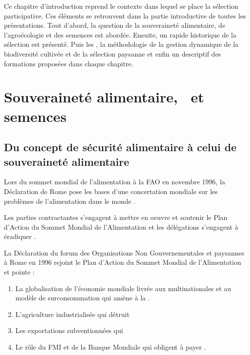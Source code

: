 Ce chapitre d'introduction reprend le contexte dans lequel se place la sélection participative.
Ces éléments se retrouvent dans la partie introductive de toutes les présentations.
Tout d'abord, la question de la souveraineté alimentaire, de l'agroécologie et des semences est abordée.
Ensuite, un rapide historique de la sélection est présenté.
Puis les \MSPs, 
la méthodologie de la gestion dynamique de la biodiversité cultivée et de la sélection paysanne et enfin
un descriptif des formations proposées dans chaque chapitre.

\newpage


\section{Souveraineté alimentaire, \agec~et semences}
\subsection{Du concept de sécurité alimentaire à celui de souveraineté alimentaire}

Lors du sommet mondial de l'alimentation à la FAO en novembre 1996, la Déclaration de Rome pose les bases d'une concertation mondiale sur les problèmes de l'alimentation dans le monde \cite{fao_declaration_1996}.

Les parties contractantes s'engagent à mettre en oeuvre et soutenir le Plan d’Action du Sommet Mondial de l’Alimentation et les délégations s'engagent à éradiquer .

La Déclaration du forum des Organisations Non Gouvernementales et paysannes à Rome en 1996 rejoint le Plan d’Action du Sommet Mondial de l’Alimentation et pointe  : 
\begin{enumerate}
\item La globalisation de l'économie mondiale livrée aux multinationales et au modèle de surconsommation qui amène à la .
\item L'agriculture industrialisée qui détruit 
\item Les exportations subventionnées qui %
\item Le rôle du FMI et de la Banque Mondiale qui obligent  à payer .
\end{enumerate}

